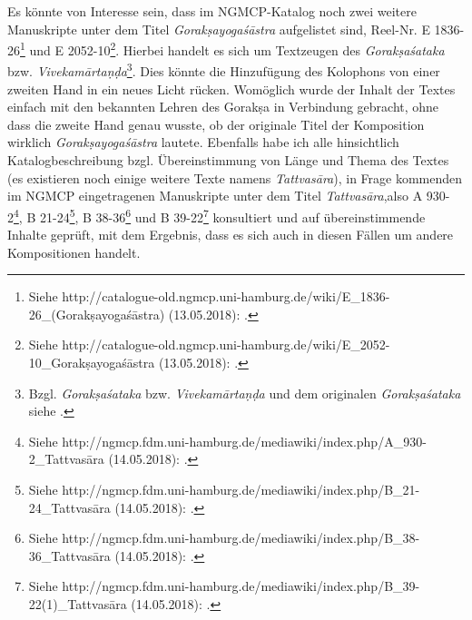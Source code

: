 \documentclass[a4paper,12pt]{article}
\begin{document}
{Es könnte von Interesse sein, dass im NGMCP-Katalog noch zwei weitere Manuskripte unter dem Titel \textit{Gorakṣayogaśāstra} aufgelistet sind, Reel-Nr. E 1836-26\footnote{\raggedright{Siehe http://catalogue-old.ngmcp.uni-hamburg.de/wiki/E\_1836-26\_(Gorakṣayogaśāstra) (13.05.2018): \textcite{gshastra1}.}} und E 2052-10\footnote{\raggedright{Siehe http://catalogue-old.ngmcp.uni-hamburg.de/wiki/E\_2052-10\_Gorakṣayogaśāstra (13.05.2018): \textcite{gshastra2}.}}. Hierbei handelt es sich um Textzeugen des \textit{Gorakṣaśataka} bzw. \textit{Vivekamārtaṇḍa}\footnote{Bzgl. \textit{Gorakṣaśataka} bzw. \textit{Vivekamārtaṇḍa} und dem originalen \textit{Gorakṣaśataka} siehe \parencite[262]{mallinson2012sataka}.}. Dies könnte die Hinzufügung des Kolophons von einer zweiten Hand in ein neues Licht rücken. Womöglich wurde der Inhalt der Textes einfach mit den bekannten Lehren des Gorakṣa in Verbindung gebracht, ohne dass die zweite Hand genau wusste, ob der originale Titel der Komposition wirklich \textit{Gorakṣayogaśāstra} lautete. Ebenfalls habe ich alle hinsichtlich Katalogbeschreibung bzgl. Übereinstimmung von Länge und Thema des Textes (es existieren noch einige weitere Texte namens \textit{Tattvasāra}), in Frage kommenden im NGMCP eingetragenen Manuskripte unter dem Titel \textit{Tattvasāra},also A 930-2\footnote{Siehe http://ngmcp.fdm.uni-hamburg.de/mediawiki/index.php/A\_930-2\_Tattvasāra (14.05.2018): \textcite{tattvasara1}.}, B 21-24\footnote{Siehe http://ngmcp.fdm.uni-hamburg.de/mediawiki/index.php/B\_21-24\_Tattvasāra (14.05.2018): \textcite{tattvasara2}.}, B 38-36\footnote{Siehe http://ngmcp.fdm.uni-hamburg.de/mediawiki/index.php/B\_38-36\_Tattvasāra (14.05.2018): \textcite{tattvasara3}.} und B 39-22\footnote{Siehe http://ngmcp.fdm.uni-hamburg.de/mediawiki/index.php/B\_39-22(1)\_Tattvasāra (14.05.2018): \textcite{tattvasara3}.} konsultiert und auf übereinstimmende Inhalte geprüft, mit dem Ergebnis, dass es sich auch in diesen Fällen um andere Kompositionen handelt.   

}
\end{document}
